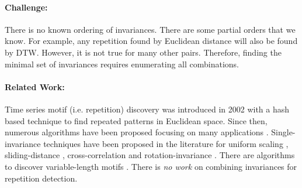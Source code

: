 \paragraph{Challenge:}

There is no known ordering of invariances. There are some partial orders that we know. For example, any repetition found by Euclidean distance will also be found by DTW. However, it is not true for many other pairs. Therefore, finding the minimal set of invariances requires enumerating all combinations.	


\paragraph{Related Work:}

Time series motif (i.e. repetition) discovery was introduced in 2002 \cite{Lin:02} with a hash based technique to find repeated patterns in Euclidean space. Since then, numerous algorithms have been proposed focusing on many applications \cite{Tanaka:05,Patel:02,Castro:10,Tang:08,Narang:11}. 
Single-invariance techniques have been proposed in the literature for uniform scaling \cite{Yankov:07}, sliding-distance \cite{Mueen:11}, cross-correlation \cite{Mueen:14a} and rotation-invariance \cite{Vlachos2004}. There are algorithms to discover variable-length motifs \cite{Lin:12,Vit:11,Tang:08,Mueen:13}. There is {\it no work} on combining invariances for repetition detection.






%
%


